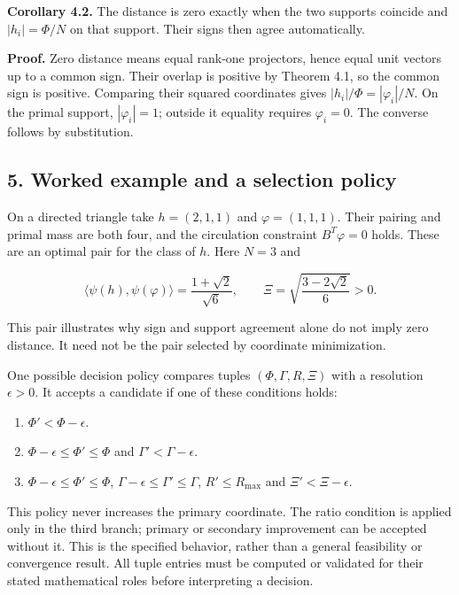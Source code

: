 \documentclass[
]{article}
\providecommand{\tightlist}{%
  \setlength{\itemsep}{0pt}\setlength{\parskip}{0pt}}
\begin{document}
\textbf{Corollary 4.2.} The distance is zero exactly when the two
supports coincide and \(|h_i|=\Phi/N\) on that support. Their signs then
agree automatically.

\textbf{Proof.} Zero distance means equal rank-one projectors, hence
equal unit vectors up to a common sign. Their overlap is positive by
Theorem 4.1, so the common sign is positive. Comparing their squared
coordinates gives \(|h_i|/\Phi=|\varphi_i|/N\). On the primal support,
\(|\varphi_i|=1\); outside it equality requires \(\varphi_i=0\). The
converse follows by substitution.

\subsection{5. Worked example and a selection
policy}\label{worked-example-and-a-selection-policy}

On a directed triangle take \(h=(2,1,1)\) and \(\varphi=(1,1,1)\). Their
pairing and primal mass are both four, and the circulation constraint
\(B^T\varphi=0\) holds. These are an optimal pair for the class of
\(h\). Here \(N=3\) and

\[
\langle\psi(h),\psi(\varphi)\rangle=\frac{1+\sqrt2}{\sqrt6},\qquad
\Xi=\sqrt{\frac{3-2\sqrt2}{6}}>0.
\]

This pair illustrates why sign and support agreement alone do not imply
zero distance. It need not be the pair selected by coordinate
minimization.

One possible decision policy compares tuples \((\Phi,\Gamma,R,\Xi)\)
with a resolution \(\epsilon>0\). It accepts a candidate if one of these
conditions holds:

\begin{enumerate}
\def\labelenumi{\arabic{enumi}.}
\tightlist
\item
  \(\Phi'<\Phi-\epsilon\).
\item
  \(\Phi-\epsilon\le\Phi'\le\Phi\) and \(\Gamma'<\Gamma-\epsilon\).
\item
  \(\Phi-\epsilon\le\Phi'\le\Phi\),
  \(\Gamma-\epsilon\le\Gamma'\le\Gamma\), \(R'\le R_{\max}\) and
  \(\Xi'<\Xi-\epsilon\).
\end{enumerate}

This policy never increases the primary coordinate. The ratio condition
is applied only in the third branch; primary or secondary improvement
can be accepted without it. This is the specified behavior, rather than
a general feasibility or convergence result. All tuple entries must be
computed or validated for their stated mathematical roles before
interpreting a decision.
\end{document}
